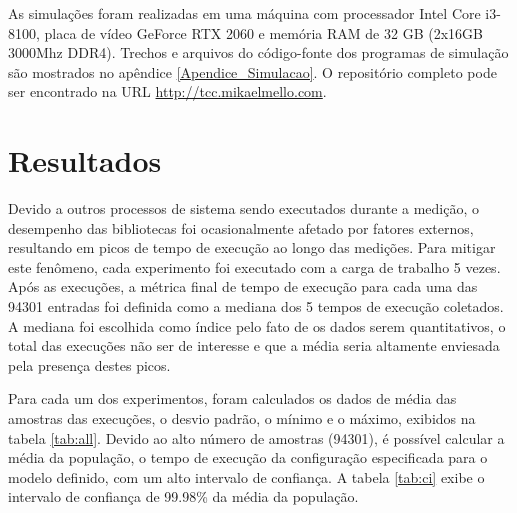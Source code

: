 As simulações foram realizadas em uma máquina com processador Intel Core i3-8100, placa de vídeo GeForce RTX 2060 e memória RAM de 32 GB (2x16GB 3000Mhz DDR4). Trechos e arquivos do código-fonte dos programas de simulação são mostrados no apêndice \ref{Apendice_Simulacao}. O repositório completo pode ser encontrado na URL \url{http://tcc.mikaelmello.com}.

\section{Resultados}

Devido a outros processos de sistema sendo executados durante a medição, o desempenho das bibliotecas foi ocasionalmente afetado por fatores externos, resultando em picos de tempo de execução ao longo das medições. Para mitigar este fenômeno, cada experimento foi executado com a carga de trabalho 5 vezes. Após as execuções, a métrica final de tempo de execução para cada uma das 94301 entradas foi definida como a mediana dos 5 tempos de execução coletados. A mediana foi escolhida como índice pelo fato de os dados serem quantitativos, o total das execuções não ser de interesse e que a média seria altamente enviesada pela presença destes picos.

Para cada um dos experimentos, foram calculados os dados de média das amostras das execuções, o desvio padrão, o mínimo e o máximo, exibidos na tabela \ref{tab:all}. Devido ao alto número de amostras (94301), é possível calcular a média da população, o tempo de execução da configuração especificada para o modelo definido, com um alto intervalo de confiança. A tabela \ref{tab:ci} exibe o intervalo de confiança de 99.98\% da média da população.

